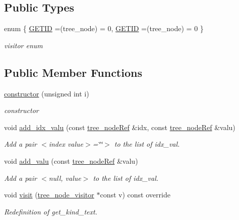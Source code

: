 \subsection*{Public Types}
\begin{DoxyCompactItemize}
\item 
enum \{ \hyperlink{structconstructor_a58bda1b1cc5faa50c706bc298b025b11afca8767786d8cffa6df9916cd78e5cde}{G\+E\+T\+ID} =(tree\+\_\+node) = 0, 
\hyperlink{structconstructor_a58bda1b1cc5faa50c706bc298b025b11afca8767786d8cffa6df9916cd78e5cde}{G\+E\+T\+ID} =(tree\+\_\+node) = 0
 \}\begin{DoxyCompactList}\small\item\em visitor enum \end{DoxyCompactList}
\end{DoxyCompactItemize}
\subsection*{Public Member Functions}
\begin{DoxyCompactItemize}
\item 
\hyperlink{structconstructor_a24bb46e73fa143ab2518ffd5a322991a}{constructor} (unsigned int i)
\begin{DoxyCompactList}\small\item\em constructor \end{DoxyCompactList}\item 
void \hyperlink{structconstructor_a8c1ec0444fc120cdd26e22e3425a2d7e}{add\+\_\+idx\+\_\+valu} (const \hyperlink{tree__node_8hpp_a6ee377554d1c4871ad66a337eaa67fd5}{tree\+\_\+node\+Ref} \&idx, const \hyperlink{tree__node_8hpp_a6ee377554d1c4871ad66a337eaa67fd5}{tree\+\_\+node\+Ref} \&valu)
\begin{DoxyCompactList}\small\item\em Add a pair $<$index value$>$=\char`\"{}\char`\"{}$>$ to the list of idx\+\_\+val. \end{DoxyCompactList}\item 
void \hyperlink{structconstructor_a61e1defa27b46a8dcd1960e2beaf2ae8}{add\+\_\+valu} (const \hyperlink{tree__node_8hpp_a6ee377554d1c4871ad66a337eaa67fd5}{tree\+\_\+node\+Ref} \&valu)
\begin{DoxyCompactList}\small\item\em Add a pair $<$null, value$>$ to the list of idx\+\_\+val. \end{DoxyCompactList}\item 
void \hyperlink{structconstructor_ab925f188b5f5eb45088c8c72ea11055e}{visit} (\hyperlink{classtree__node__visitor}{tree\+\_\+node\+\_\+visitor} $\ast$const v) const override
\begin{DoxyCompactList}\small\item\em Redefinition of get\+\_\+kind\+\_\+text. \end{DoxyCompactList}\end{DoxyCompactItemize}
